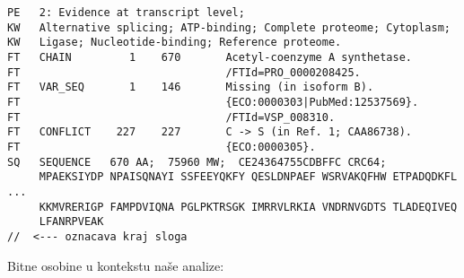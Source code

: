 \begin{lstlisting}
PE   2: Evidence at transcript level;
KW   Alternative splicing; ATP-binding; Complete proteome; Cytoplasm; 
KW   Ligase; Nucleotide-binding; Reference proteome.                  
FT   CHAIN         1    670       Acetyl-coenzyme A synthetase.
FT                                /FTId=PRO_0000208425.
FT   VAR_SEQ       1    146       Missing (in isoform B).
FT                                {ECO:0000303|PubMed:12537569}.
FT                                /FTId=VSP_008310.
FT   CONFLICT    227    227       C -> S (in Ref. 1; CAA86738).
FT                                {ECO:0000305}.
SQ   SEQUENCE   670 AA;  75960 MW;  CE24364755CDBFFC CRC64;
     MPAEKSIYDP NPAISQNAYI SSFEEYQKFY QESLDNPAEF WSRVAKQFHW ETPADQDKFL
...
     KKMVRERIGP FAMPDVIQNA PGLPKTRSGK IMRRVLRKIA VNDRNVGDTS TLADEQIVEQ
     LFANRPVEAK
//  <--- oznacava kraj sloga
\end{lstlisting}

Bitne osobine u kontekstu naše analize:

